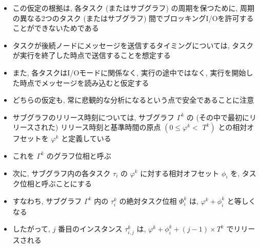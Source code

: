 \begin{frame}{}
    \begin{itemize}
        \item この仮定の根拠は, 各タスク (またはサブグラフ) の周期を保つために, 周期の異なる2つのタスク (またはサブグラフ) 間でブロッキングI/Oを許可することができないためである
        \item タスクが後続ノードにメッセージを送信するタイミングについては, タスクが実行を終了した時点で送信することを想定する
        \item また, 各タスクはI/Oモードに関係なく, 実行の途中ではなく, 実行を開始した時点でメッセージを読み込むと仮定する
        \item どちらの仮定も, 常に悲観的な分析になるという点で安全であることに注意
    \end{itemize}
\end{frame}

\begin{frame}{}
    \begin{itemize}
        \item サブグラフのリリース時刻については, サブグラフ $\Gamma^{k}$ の (その中で最初にリリースされた) リリース時刻と基準時間の原点 $\left(0 \leq \varphi^{k}<\right.$  $\left.T^{k}\right)$ との相対オフセットを $\varphi^{k}$ と定義している
        \item これを $\Gamma^{k}$ のグラフ位相と呼ぶ
        \item 次に, サブグラフ内の各タスク $\tau_{i}$ の $\varphi^{k}$ に対する相対オフセット $\phi_{i}$ を, タスク位相と呼ぶことにする
        \item すなわち, サブグラフ $\Gamma^{k}$ 内の $\tau_{i}^{k}$ の絶対タスク位相 $\Phi_{i}^{k}$ は, $\varphi^{k}+\phi_{i}^{k}$ と等しくなる
        \item したがって, $j$ 番目のインスタンス $\tau_{i, j}^{k}$ は, $\varphi^{k}+\phi_{i}^{k}+(j-1) \times T^{k}$ でリリースされる
    \end{itemize}
\end{frame}


